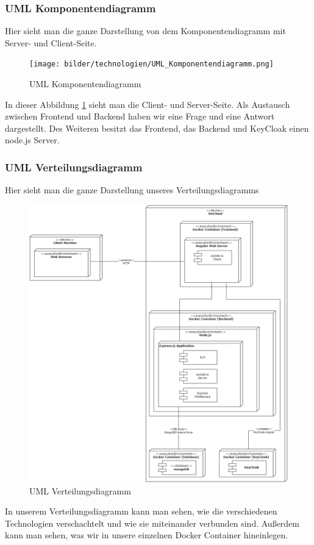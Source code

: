 \newpage

\subsubsection{UML Komponentendiagramm}
Hier sieht man die ganze Darstellung von dem Komponentendiagramm mit Server- und Client-Seite.
\begin{figure}[H]
    \centering
    \texttt{[image: bilder/technologien/UML\_Komponentendiagramm.png]}
    \caption{UML Komponentendiagramm}
    \label{fig:UML_Komponentendiagramm}
    \end{figure}
\noindent In dieser Abbildung \ref{fig:UML_Komponentendiagramm} sieht man die Client- und Server-Seite. 
Als Austausch zwischen Frontend und Backend haben wir eine Frage und eine Antwort dargestellt.
Des Weiteren besitzt das Frontend, das Backend und KeyCloak einen node.js Server.

\newpage

\subsubsection{UML Verteilungsdiagramm}
Hier sieht man die ganze Darstellung unseres Verteilungsdiagramms
\begin{figure}[H]
\centering
\includegraphics[width=1.0\textwidth]{bilder/technologien/UML_Verteilunsgdiagramm.png}
\caption{UML Verteilungsdiagramm}
\label{fig:UML_Verteilungsdiagramm}
\end{figure}
\noindent In unserem Verteilungsdiagramm kann man sehen, 
wie die verschiedenen Technologien verschachtelt und wie sie miteinander verbunden sind.
Außerdem kann man sehen, was wir in unsere einzelnen Docker Container hineinlegen.